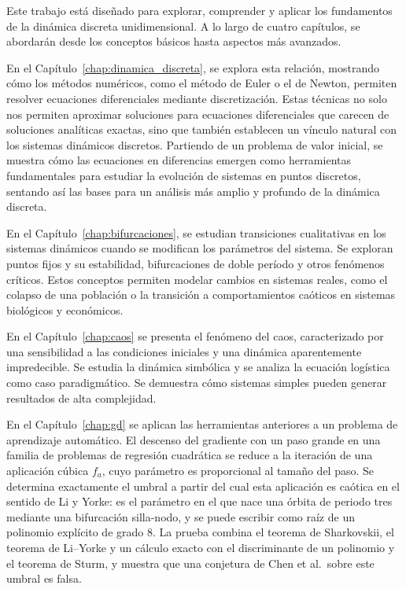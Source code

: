 \documentclass[12pt,a4paper]{report}
\theoremstyle{definition}
\begin{document}
Este trabajo está diseñado para explorar, comprender y aplicar los fundamentos de la dinámica discreta unidimensional. A lo largo de cuatro capítulos, se abordarán desde los conceptos básicos hasta aspectos más avanzados.

En el Capítulo~\ref{chap:dinamica_discreta}, se explora esta relación, mostrando cómo los métodos numéricos, como el método de Euler o el de Newton, permiten resolver ecuaciones diferenciales mediante discretización. Estas técnicas no solo nos permiten aproximar soluciones para ecuaciones diferenciales que carecen de soluciones analíticas exactas, sino que también establecen un vínculo natural con los sistemas dinámicos discretos. Partiendo de un problema de valor inicial, se muestra cómo las ecuaciones en diferencias emergen como herramientas fundamentales para estudiar la evolución de sistemas en puntos discretos, sentando así las bases para un análisis más amplio y profundo de la dinámica discreta.

En el Capítulo~\ref{chap:bifurcaciones}, se estudian transiciones cualitativas en los sistemas dinámicos cuando se modifican los parámetros del sistema. Se exploran puntos fijos y su estabilidad, bifurcaciones de doble período y otros fenómenos críticos. Estos conceptos permiten modelar cambios en sistemas reales, como el colapso de una población o la transición a comportamientos caóticos en sistemas biológicos y económicos.

En el Capítulo~\ref{chap:caos} se presenta el fenómeno del caos, caracterizado por una sensibilidad a las condiciones iniciales y una dinámica aparentemente impredecible. Se estudia la dinámica simbólica y se analiza la ecuación logística como caso paradigmático. Se demuestra cómo sistemas simples pueden generar resultados de alta complejidad.

En el Capítulo~\ref{chap:gd} se aplican las herramientas anteriores a un problema de aprendizaje automático. El descenso del gradiente con un paso grande en una familia de problemas de regresión cuadrática se reduce a la iteración de una aplicación cúbica $f_a$, cuyo parámetro es proporcional al tamaño del paso. Se determina exactamente el umbral a partir del cual esta aplicación es caótica en el sentido de Li y Yorke: es el parámetro en el que nace una órbita de periodo tres mediante una bifurcación silla-nodo, y se puede escribir como raíz de un polinomio explícito de grado $8$. La prueba combina el teorema de Sharkovskii, el teorema de Li--Yorke y un cálculo exacto con el discriminante de un polinomio y el teorema de Sturm, y muestra que una conjetura de Chen et al.\ sobre este umbral es falsa.
\end{document}
